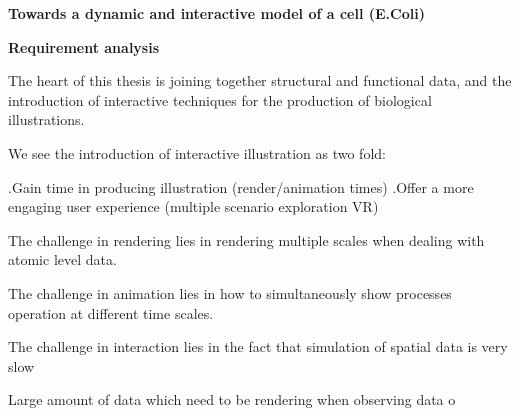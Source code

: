 
%
%
%
%


\textbf{Towards a dynamic and interactive model of a cell (E.Coli)}

\textbf{Requirement analysis}

The heart of this thesis is joining together structural and functional data, and the introduction of interactive techniques for the production of biological illustrations.

We see the introduction of interactive illustration as two fold:

.Gain time in producing illustration (render/animation times)
.Offer a more engaging user experience (multiple scenario exploration VR)

The challenge in rendering lies in rendering multiple scales when dealing with atomic level data.

The challenge in animation lies in how to simultaneously show processes operation at different time scales.

The challenge in interaction lies in the fact that simulation of spatial data is very slow

Large amount of data which need to be rendering when observing data o


%
%
%
%
% 
%
%
%
%



